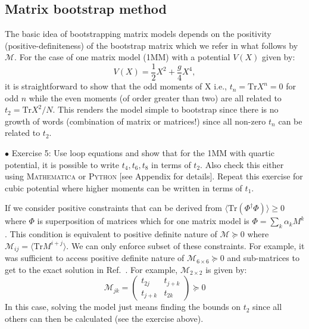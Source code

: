 \documentclass[11pt]{article}
\newcommand{\MA}{\textsc{Mathematica }}
\newcommand{\PY}{\textsc{Python }}
\begin{document}
\subsection{Matrix bootstrap method}

The basic idea of bootstrapping matrix models depends on the 
positivity (positive-definiteness) of the bootstrap matrix which we refer in what follows 
by $\mathcal{M}$. For the case of one matrix model (1MM) with a potential $V(X)$ given by: 
\begin{equation}
    V(X) = \frac12 X^2 + \frac{g}{4} X^4, 
\end{equation}
it is straightforward to show that the odd moments of X i.e., $ t_{n} = \mbox{Tr} X^n = 0$ for odd $n$
while the even moments (of order greater than two) are all related to $t_{2} = \mbox{Tr} X^2/N$. This renders the 
model simple to bootstrap since there is no growth of words (combination of matrix or matrices!)
since all non-zero $t_{n}$ can be related to $t_{2}$. 
\begin{mdframed}[backgroundcolor=blue!3] 
	\textsc{} 
	$\bullet$ Exercise 5: Use loop equations and show that for the 1MM with quartic potential, it is possible to write $t_{4}, t_{6}, t_{8}$ in terms of $t_{2}$. Also check this either using \MA or \PY [see Appendix for details]. 
Repeat this exercise for cubic potential where higher moments can be written in terms of $t_1$.  
\end{mdframed} 
If we consider positive constraints that can be derived from $\langle \mbox{Tr}(\Phi^{\dagger}\Phi) \rangle \ge 0 $
where $\Phi$ is superposition of matrices which for one matrix model is 
$ \Phi = \sum_{k} \alpha_{k} M^{k}$. This condition is equivalent to positive definite nature of
$\mathcal{M} \succeq 0 $ where $ \mathcal{M}_{ij} = \langle \mbox{Tr} M^{i+j} \rangle$. 
We can only enforce subset of these constraints. For example, it was sufficient to 
access positive definite nature of $\mathcal{M}_{6 \times 6} \succeq 0 $ 
and sub-matrices to get to the exact solution in Ref.~\cite{Lin:2020mme}. 
For example, $\mathcal{M}_{2 \times 2}$ is given by:
\begin{equation}
	\mathcal{M}_{jk} = 
	\begin{pmatrix}
		t_{2j} & t_{j+k}  \\
		t_{j+k} & t_{2k}  
	\end{pmatrix}  \succeq 0
\end{equation}
In this case, solving the model just means finding the bounds on $t_{2}$ 
since all others can then be calculated (see the exercise above). 
\end{document}
